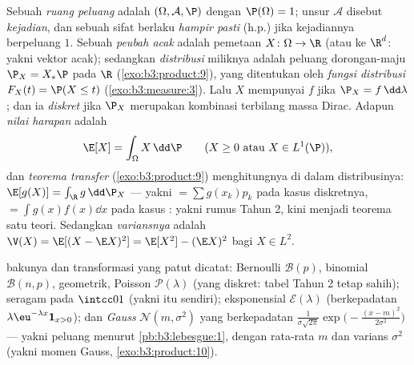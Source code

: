 \begin{definition}\label{def:b3:probability:space}
Sebuah \emph{ruang peluang} adalah
 $(\Omega, \mathcal A, \P)$ dengan $\P(\Omega) =
1$; unsur $\mathcal A$ disebut \emph{kejadian}, dan sebuah sifat
berlaku \emph{hampir pasti} (h.p.) jika kejadiannya berpeluang
$1$. Sebuah \emph{peubah acak} adalah pemetaan  $X \colon \Omega \to \R$ (atau ke
$\R^d$: yakni vektor acak); sedangkan \emph{distribusi} miliknya adalah  peluang dorongan-maju $\P_X =
X_*\P$ pada $\R$ (\cref{exo:b3:product:9}), yang ditentukan oleh
\emph{fungsi distribusi} $F_X(t) = \P(X \leq t)$
(\cref{exo:b3:measure:3}). Lalu $X$ mempunyai \emph{} $f$ jika
$\P_X = f\,\dd\lambda$; dan ia \emph{diskret} jika $\P_X$ merupakan
kombinasi terbilang massa Dirac. Adapun
\emph{nilai harapan} adalah
\[
\E[X] = \int_\Omega X\,\dd\P
\qquad (X \geq 0 \text{ atau } X \in L^1(\P)),
\]
dan \emph{teorema transfer} (\cref{exo:b3:product:9})
menghitungnya di dalam distribusinya: $\E[g(X)] = \int_\R g\,\dd\P_X$ ---
yakni $= \sum g(x_k)p_k$ pada kasus diskretnya, $= \int
g(x)f(x)\dd x$ pada kasus : yakni rumus Tahun 2, kini menjadi
teorema satu teori. Sedangkan \emph{variansnya} adalah $\V(X) =
\E[(X - \E X)^2] = \E[X^2] - (\E X)^2$ bagi $X \in L^2$.
\end{definition}

\begin{example}\label{ex:b3:probability:laws}
 bakunya dan transformasi yang patut dicatat: Bernoulli
$\mathcal B(p)$, binomial $\mathcal B(n, p)$, geometrik,
Poisson $\mathcal P(\lambda)$ (yang diskret: tabel Tahun 2
tetap sahih); seragam pada $\intcc01$ (yakni 
itu sendiri); eksponensial $\mathcal E(\lambda)$ (berkepadatan
$\lambda\eu^{-\lambda x}\mathbf 1_{x>0}$); dan
\emph{Gauss} $\mathcal N(m, \sigma^2)$
yang berkepadatan $\frac1{\sigma\sqrt{2\pi}}\exp\bigl(-\frac{(x -
m)^2}{2\sigma^2}\bigr)$ --- yakni  peluang menurut
\cref{pb:b3:lebesgue:1}, dengan rata-rata $m$ dan varians
$\sigma^2$ (yakni momen Gauss, \cref{exo:b3:product:10}).
\end{example}

